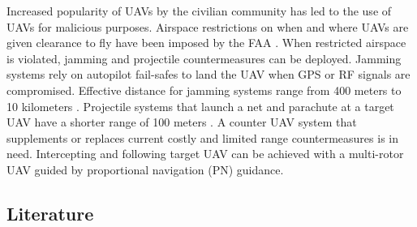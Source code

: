 \documentclass[conference]{IEEEtran}
\begin{document}
Increased popularity of UAVs by the civilian community has led to the use of UAVs for malicious purposes. Airspace restrictions on when and where UAVs are given clearance to fly have been imposed by the FAA \cite{federal_aviation_administration_2017}. When restricted airspace is violated, jamming and projectile countermeasures can be deployed. Jamming systems rely on autopilot fail-safes to land the UAV when GPS or RF signals are compromised. Effective distance for jamming systems range from 400 meters \cite{Battelle} to 10 kilometers \cite{Blighter}. Projectile systems that launch a net and parachute at a target UAV have a shorter range of 100 meters \cite{SkyWall}. A counter UAV system that supplements or replaces current costly and limited range countermeasures is in need. Intercepting and following target UAV can be achieved with a multi-rotor UAV guided by proportional navigation (PN) guidance.

\subsection{Literature}







\end{document}
